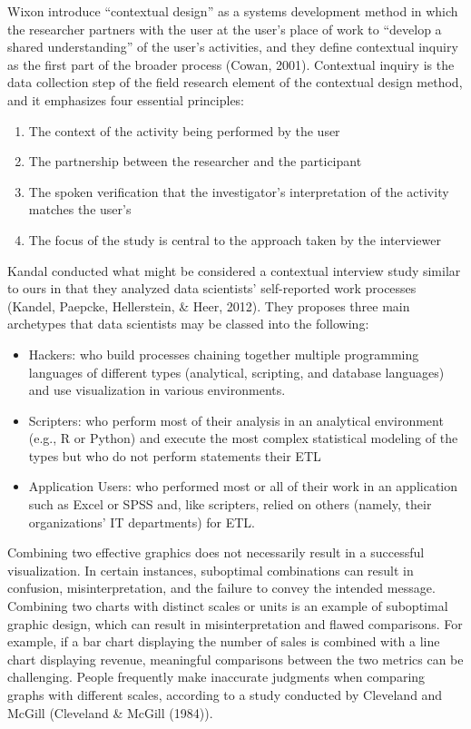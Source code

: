 \documentclass[print]{nuthesis}
\providecommand{\tightlist}{%
  \setlength{\itemsep}{0pt}\setlength{\parskip}{0pt}}
\begin{document}
Wixon introduce ``contextual design'' as a systems development method in which the researcher partners with the user at the user's place of work to ``develop a shared understanding'' of the user's activities, and they define contextual inquiry as the first part of the broader process (Cowan, 2001).
Contextual inquiry is the data collection step of the field research element of the contextual design method, and it emphasizes four essential principles:

\begin{enumerate}
\def\labelenumi{\arabic{enumi}.}
\tightlist
\item
  The context of the activity being performed by the user
\item
  The partnership between the researcher and the participant
\item
  The spoken verification that the investigator's interpretation of the activity matches the user's
\item
  The focus of the study is central to the approach taken by the interviewer
\end{enumerate}

Kandal conducted what might be considered a contextual interview study similar to ours in that they analyzed data scientists' self-reported work processes (Kandel, Paepcke, Hellerstein, \& Heer, 2012).
They proposes three main archetypes that data scientists may be classed into the following:

\begin{itemize}
\tightlist
\item
  Hackers: who build processes chaining together multiple programming languages of different types (analytical, scripting, and database languages) and use visualization in various environments.
\item
  Scripters: who perform most of their analysis in an analytical environment (e.g., R or Python) and execute the most complex statistical modeling of the types but who do not perform statements their ETL
\item
  Application Users: who performed most or all of their work in an application such as Excel or SPSS and, like scripters, relied on others (namely, their organizations' IT departments) for ETL.
\end{itemize}

Combining two effective graphics does not necessarily result in a successful visualization.
In certain instances, suboptimal combinations can result in confusion, misinterpretation, and the failure to convey the intended message.
Combining two charts with distinct scales or units is an example of suboptimal graphic design, which can result in misinterpretation and flawed comparisons.
For example, if a bar chart displaying the number of sales is combined with a line chart displaying revenue, meaningful comparisons between the two metrics can be challenging.
People frequently make inaccurate judgments when comparing graphs with different scales, according to a study conducted by Cleveland and McGill (Cleveland \& McGill (1984)).
\end{document}
